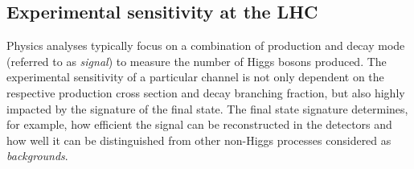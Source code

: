 \subsection{Experimental sensitivity at the LHC}
\label{subsec:exp-accessibility}



Physics analyses typically focus on a combination of production and decay mode (referred to as \emph{signal}) to measure the number of Higgs bosons produced. The experimental sensitivity of a particular channel is not only dependent on the respective production cross section and decay branching fraction, but also highly impacted by the signature of the final state. The final state signature determines, for example, how efficient the signal can be reconstructed in the detectors and how well it can be distinguished from other non-Higgs processes considered as \emph{backgrounds}. 

